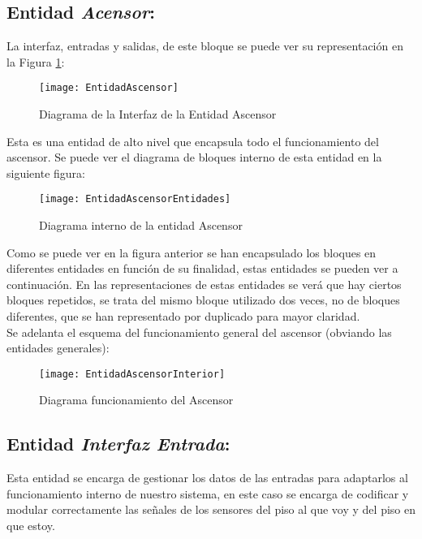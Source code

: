 \subsection{Entidad \textit{Acensor}:}
    
    La interfaz, entradas y salidas, de este bloque se puede ver su representación en la Figura \ref{fig:EntidadIAscensor}:
    
    \begin{figure}[H]
		    \centering
		    \texttt{[image: EntidadAscensor]}
		    \caption{Diagrama de la Interfaz de la Entidad Ascensor}
		    \label{fig:EntidadIAscensor}
	\end{figure}
	
	Esta es una entidad de alto nivel que encapsula todo el funcionamiento del ascensor. Se puede ver el diagrama de bloques interno de esta entidad en la siguiente figura: 
	
	\begin{figure}[H]
		    \centering
		    \texttt{[image: EntidadAscensorEntidades]}
		    \caption{Diagrama interno de la entidad Ascensor}
		    \label{fig:EntidadIAscensorEntidades}
	\end{figure}
	
	Como se puede ver en la figura anterior se han encapsulado los bloques en diferentes entidades en función de su finalidad, estas entidades se pueden ver a continuación. En las representaciones de estas entidades se verá que hay ciertos bloques repetidos, se trata del mismo bloque utilizado dos veces, no de bloques diferentes, que se han representado por duplicado para mayor claridad. \\ 

	Se adelanta el esquema del funcionamiento general del ascensor (obviando las entidades generales):

	\begin{figure}[H]
		    \centering
		    \texttt{[image: EntidadAscensorInterior]}
		    \caption{Diagrama funcionamiento del Ascensor}
		    \label{fig:EntidadIAscensorInterior}
	\end{figure}

\subsection{Entidad \textit{Interfaz Entrada}:}
	Esta entidad se encarga de gestionar los datos de las entradas para adaptarlos al funcionamiento interno de nuestro sistema, en este caso se encarga de codificar y modular correctamente las señales de los sensores del piso al que voy y del piso en que estoy. \\ 

